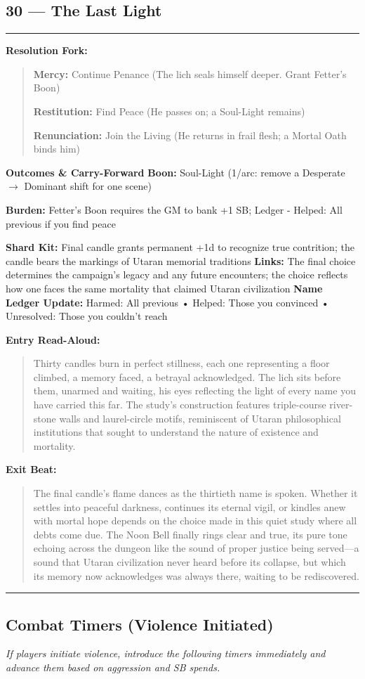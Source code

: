 \documentclass[18pt, letterpaper, twoside]{article}
\newenvironment{floorbox}[1]{%
    \begin{center}
    \begin{minipage}{0.95\textwidth}
    \subsection*{#1}
    \vspace{-0.5em}
    \rule{\textwidth}{0.5pt}
    \vspace{0.5em}
}{%
    \vspace{0.5em}
    \rule{\textwidth}{0.5pt}
    \end{minipage}
    \end{center}
}
\newenvironment{resolutionbox}{%
    \vspace{0.5em}
    \noindent\textbf{Resolution Fork:}
    \begin{quote}
}{%
    \end{quote}
    \vspace{0.5em}
}
\newenvironment{boxedtext}[1]{%
    \vspace{0.5em}
    \noindent\textbf{#1}
    \begin{quote}
}{%
    \end{quote}
    \vspace{0.5em}
}
\newcommand{\boon}[1]{\noindent\textbf{Boon:} #1\par}
\newcommand{\burden}[1]{\noindent\textbf{Burden:} #1\par}
\newcommand{\entrytext}[1]{\begin{boxedtext}{Entry Read-Aloud:} #1 \end{boxedtext}}
\newcommand{\exittext}[1]{\begin{boxedtext}{Exit Beat:} #1 \end{boxedtext}}
\begin{document}
\begin{floorbox}{30 --- The Last Light}
\begin{resolutionbox}
\textbf{Mercy:} Continue Penance (The lich seals himself deeper. Grant Fetter's Boon)

\textbf{Restitution:} Find Peace (He passes on; a Soul-Light remains)

\textbf{Renunciation:} Join the Living (He returns in frail flesh; a Mortal Oath binds him)
\end{resolutionbox}

\textbf{Outcomes \& Carry-Forward}
\boon{Soul-Light (1/arc: remove a Desperate $\rightarrow$ Dominant shift for one scene)}
\burden{Fetter's Boon requires the GM to bank +1 SB; Ledger - Helped: All previous if you find peace}
\textbf{Shard Kit:} Final candle grants permanent +1d to recognize true contrition; the candle bears the markings of Utaran memorial traditions
\textbf{Links:} The final choice determines the campaign's legacy and any future encounters; the choice reflects how one faces the same mortality that claimed Utaran civilization
\textbf{Name Ledger Update:} Harmed: All previous • Helped: Those you convinced • Unresolved: Those you couldn't reach

\entrytext{Thirty candles burn in perfect stillness, each one representing a floor climbed, a memory faced, a betrayal acknowledged. The lich sits before them, unarmed and waiting, his eyes reflecting the light of every name you have carried this far. The study's construction features triple-course river-stone walls and laurel-circle motifs, reminiscent of Utaran philosophical institutions that sought to understand the nature of existence and mortality.}

\exittext{The final candle's flame dances as the thirtieth name is spoken. Whether it settles into peaceful darkness, continues its eternal vigil, or kindles anew with mortal hope depends on the choice made in this quiet study where all debts come due. The Noon Bell finally rings clear and true, its pure tone echoing across the dungeon like the sound of proper justice being served---a sound that Utaran civilization never heard before its collapse, but which its memory now acknowledges was always there, waiting to be rediscovered.}
\end{floorbox}

\subsection*{Combat Timers (Violence Initiated)}
\emph{If players initiate violence, introduce the following timers immediately and advance them based on aggression and SB spends.}
\end{document}
